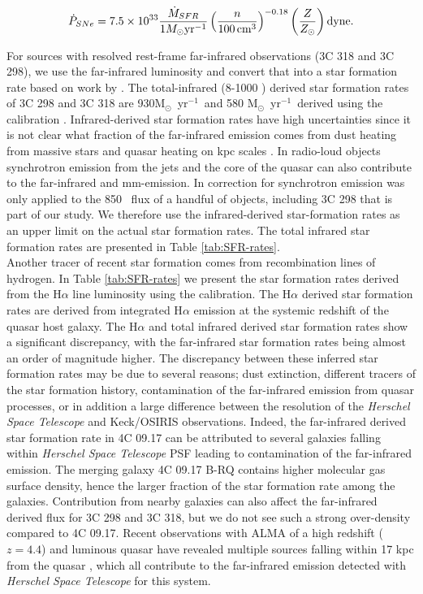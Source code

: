 \documentclass[twocolumn]{aastex63}
\newcommand{\myr}{M$_\odot$~yr$^{-1}$}
\newcommand{\ha}{H$\alpha$\xspace}
\begin{document}
\begin{equation}
    \dot{P}_{SNe} = 7.5\times 10^{33} \frac{\dot{M}_{SFR}}{1M_{\odot}{\rm yr}^{-1}} \left(\frac{n}{100\,{\rm cm}^{3}}\right)^{-0.18}
    \left(\frac{Z}{Z_\odot}\right)
    \rm dyne \label{eq:SNe_mom}.
\end{equation} 

For sources with resolved rest-frame far-infrared observations (3C 318 and 3C 298), we use the far-infrared luminosity and convert that into a star formation rate based on work by \citet{Barthel18,Barthel19}. The total-infrared (8-1000 \micron) derived star formation rates of 3C 298 and 3C 318 are 930\myr\ and 580 \myr\ derived using the \citet{Kennicutt98} calibration \citep{Podigachoski15}. Infrared-derived star formation rates have high uncertainties since it is not clear what fraction of the far-infrared emission comes from dust heating from massive stars and quasar heating on kpc scales \citep{Symeonidis17,Symeonidis21}. In radio-loud objects synchrotron emission from the jets and the core of the quasar can also contribute to the far-infrared and mm-emission. In \citet{Podigachoski15} correction for synchrotron emission was only applied to the 850 \micron\ flux of a handful of objects, including 3C 298 that is part of our study. We therefore use the infrared-derived star-formation rates as an upper limit on the actual star formation rates. The total infrared star formation rates are presented in Table \ref{tab:SFR-rates}. \\

Another tracer of recent star formation comes from recombination lines of hydrogen. In Table \ref{tab:SFR-rates} we present the star formation rates derived from the \ha line luminosity using the \citep{Kennicutt98} calibration. The \ha derived star formation rates are derived from integrated \ha emission at the systemic redshift of the quasar host galaxy. The \ha and total infrared derived star formation rates show a significant discrepancy, with the far-infrared star formation rates being almost an order of magnitude higher. The discrepancy between these inferred star formation rates may be due to several reasons; dust extinction, different tracers of the star formation history, contamination of the far-infrared emission from quasar processes, or in addition a large difference between the resolution of the \textit{Herschel Space Telescope} and Keck/OSIRIS observations. Indeed, the far-infrared derived star formation rate in 4C 09.17 can be attributed to several galaxies falling within \textit{Herschel Space Telescope} PSF leading to contamination of the far-infrared emission. The merging galaxy 4C 09.17 B-RQ contains higher molecular gas surface density, hence the larger fraction of the star formation rate among the galaxies. Contribution from nearby galaxies can also affect the far-infrared derived flux for 3C 298 and 3C 318, but we do not see such a strong over-density compared to 4C 09.17. Recent observations with ALMA of a high redshift ($z=4.4$) and luminous quasar have revealed multiple sources falling within 17 kpc from the quasar \citep{Bischetti18}, which all contribute to the far-infrared emission detected with \textit{Herschel Space Telescope} for this system. 
\end{document}

